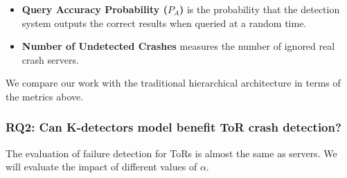 \documentclass{sig-alternate-05-2015}
\begin{document}
\begin{itemize}
  \item \textbf{Query Accuracy Probability ($P_A$)} is the probability that the detection system outputs the correct results when queried at a random time.

  \item \textbf{Number of Undetected Crashes} measures the number of ignored real crash servers.
\end{itemize}

We compare our work with the traditional hierarchical architecture \cite{felber1999failure} in terms of the metrics above.

\subsubsection*{RQ2: Can K-detectors model benefit ToR crash detection?}
\quad The evaluation of failure detection for ToRs is almost the same as servers. We will evaluate the impact of different values of $\alpha$.
\end{document}

